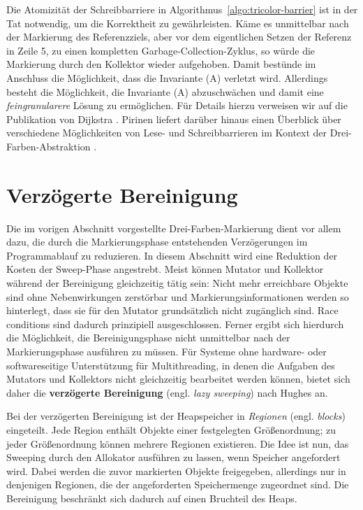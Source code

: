 Die Atomizität der Schreibbarriere  in Algorithmus~\ref{algo:tricolor-barrier} ist in der Tat notwendig, um die Korrektheit zu gewährleisten.
Käme es unmittelbar nach der Markierung des Referenzziels, aber vor dem eigentlichen Setzen der Referenz in Zeile 5, zu einen kompletten Garbage-Collection-Zyklus, so würde die Markierung durch den Kollektor wieder aufgehoben.
Damit bestünde im Anschluss die Möglichkeit, dass die Invariante (A) verletzt wird.
Allerdings besteht die Möglichkeit, die Invariante (A) abzuschwächen und damit eine \textit{feingranularere} Lösung zu ermöglichen.
Für Details hierzu verweisen wir auf die Publikation von Dijkstra \cite[S. 972ff]{dijkstra1978}.
Pirinen liefert darüber hinaus einen Überblick über verschiedene Möglichkeiten von Lese- und Schreibbarrieren im Kontext der Drei-Farben-Abstraktion \cite{pirinen}.


\section{Verzögerte Bereinigung}
\label{sec:lazy-sweep}
Die im vorigen Abschnitt vorgestellte Drei-Farben-Markierung dient vor allem dazu, die durch die Markierungsphase entstehenden Verzögerungen im Programmablauf zu reduzieren.
In diesem Abschnitt wird eine Reduktion der Kosten der Sweep-Phase angestrebt.
Meist können Mutator und Kollektor während der Bereinigung gleichzeitig tätig sein:
Nicht mehr erreichbare Objekte sind ohne Nebenwirkungen zerstörbar und Markierungsinformationen werden so hinterlegt, dass sie für den Mutator grundsätzlich nicht zugänglich sind.
Race conditions sind dadurch prinzipiell ausgeschlossen.
Ferner ergibt sich hierdurch die Möglichkeit, die Bereinigungsphase nicht unmittelbar nach der Markierungsphase ausführen zu müssen.
Für Systeme ohne hardware- oder softwareseitige Unterstützung für Multithreading, in denen die Aufgaben des Mutators und Kollektors nicht gleichzeitig bearbeitet werden können, bietet sich daher die \textbf{verzögerte Bereinigung} (engl. \textit{lazy sweeping}) nach Hughes \cite{hughes} an.

Bei der verzögerten Bereinigung ist der Heapspeicher in \textit{Regionen} (engl. \textit{blocks}) eingeteilt.
Jede Region enthält Objekte einer festgelegten Größenordnung; zu jeder Größenordnung können mehrere Regionen existieren.
Die Idee ist nun, das Sweeping durch den Allokator ausführen zu lassen, wenn Speicher angefordert wird.
Dabei werden die zuvor markierten Objekte freigegeben, allerdings nur in denjenigen Regionen, die der angeforderten Speichermenge zugeordnet sind.
Die Bereinigung beschränkt sich dadurch auf einen Bruchteil des Heaps.

